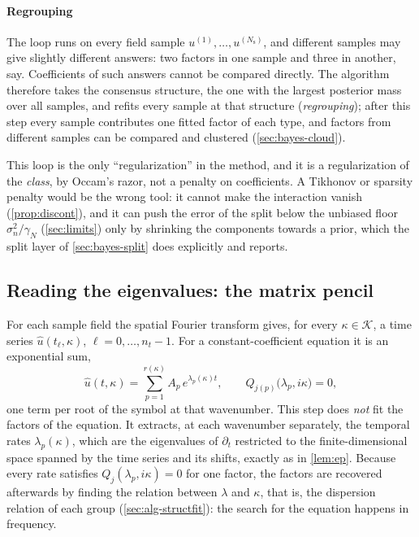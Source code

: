 \documentclass[11pt]{article}
\theoremstyle{plain}
\theoremstyle{definition}
\theoremstyle{remark}
\newcommand{\gN}{\gamma_{N}}                %
\newcommand{\noise}{\sigma_{n}}             %
\newcommand{\Nsamp}{N_{\mathrm s}}          %
\begin{document}
\paragraph{Regrouping} The loop runs on every field sample $u^{(1)},\dots,u^{(\Nsamp)}$, and different samples may give
slightly different answers: two factors in one sample and three in another, say. Coefficients of such answers cannot be
compared directly. The algorithm therefore takes the consensus structure, the one with the largest posterior mass over
all samples, and refits every sample at that structure (\emph{regrouping}); after this step every sample contributes one
fitted factor of each type, and factors from different samples can be compared and clustered (\cref{sec:bayes-cloud}).

This loop is the only ``regularization'' in the method, and it is a regularization of the
\emph{class}, by Occam's razor, not a penalty on coefficients. A Tikhonov or sparsity penalty would be
the wrong tool: it cannot make the interaction vanish (\cref{prop:discont}), and it can push the error of the split
below the unbiased floor $\noise^2/\gN$ (\cref{sec:limits}) only by shrinking the components towards a prior, which the
split layer of \cref{sec:bayes-split} does explicitly and reports.



\subsection{Reading the eigenvalues: the matrix pencil}\label{sec:alg-pencil}
For each sample field the spatial Fourier transform gives, for every $\kappa\in\mathcal K$, a time series
$\hat u(t_\ell,\kappa)$, $\ell=0,\dots,n_t-1$. For a constant-coefficient equation it is an exponential sum,
\begin{equation}\label{eq:expsum}
  \hat u(t,\kappa)=\sum_{p=1}^{r(\kappa)}A_p\,e^{\lambda_p(\kappa)t},\qquad Q_{j(p)}\big(\lambda_p,i\kappa\big)=0,
\end{equation}
one term per root of the symbol at that wavenumber. This step does \emph{not} fit the factors of the equation. It
extracts, at each wavenumber separately, the temporal rates $\lambda_p(\kappa)$, which are the eigenvalues of $\partial_t$
restricted to the finite-dimensional space spanned by the time series and its shifts, exactly as in \cref{lem:ep}.
Because every rate satisfies $Q_j(\lambda_p,i\kappa)=0$ for one factor, the factors are recovered afterwards by finding
the relation between $\lambda$ and $\kappa$, that is, the dispersion relation of each group (\cref{sec:alg-structfit}):
the search for the equation happens in frequency.
\end{document}
